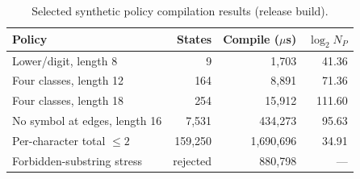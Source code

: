 \begin{table}[t]
\centering
\small
\caption{Selected synthetic policy compilation results (release build).}
\label{tab:policy}
\begin{tabular}{lrrr}
\toprule
Policy & States & Compile ($\mu$s) & $\log_2 N_P$ \\
\midrule
Lower/digit, length 8 & 9 & 1,703 & 41.36 \\
Four classes, length 12 & 164 & 8,891 & 71.36 \\
Four classes, length 18 & 254 & 15,912 & 111.60 \\
No symbol at edges, length 16 & 7,531 & 434,273 & 95.63 \\
Per-character total $\le2$ & 159,250 & 1,690,696 & 34.91 \\
Forbidden-substring stress & rejected & 880,798 & --- \\
\bottomrule
\end{tabular}
\end{table}
